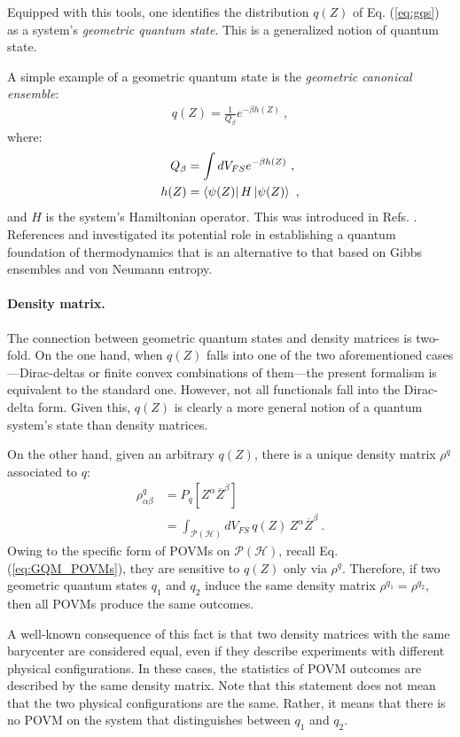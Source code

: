 \documentclass[draft,nofootinbib,pre,twocolumn,showpacs,showkeys,preprintnumbers,floatfix]{revtex4-1}
\newcommand{\1}{\mathbbm{1}}
\newcommand{\intP}{\int_{\mathcal{P}(\mathcal{H})} \!\!\!\!\!\!\!\!\!}
\begin{document}
Equipped with this tools, one identifies the distribution $q(Z)$ of Eq.
(\ref{eq:gqs}) as a system's \emph{geometric quantum state}. This is a
generalized notion of quantum state.

A simple example of a geometric quantum state is the 
\emph{geometric canonical ensemble}:
\begin{align*}
q(Z) = \frac{1}{Q_\beta} e^{-\beta h(Z)}
  ~,
\end{align*}
where:
\begin{align*}
  Q_\beta & = \int dV_{FS} e^{-\beta h(Z)} ~, \\
  h(Z) & = \bra{\psi(Z)}H\ket{\psi(Z)} ~,
\end{align*}
and $H$ is the system's Hamiltonian operator. This was introduced in 
Refs. \cite{Brody1998}. References \cite{Brody2016} and \cite{Anza20b} 
investigated its potential role in establishing a quantum foundation of
thermodynamics that is an alternative to that based on Gibbs ensembles and von
Neumann entropy. 

\paragraph*{Density matrix.}
The connection between geometric quantum states and density matrices is
two-fold. On the one hand, when $q(Z)$ falls into one of the
two aforementioned cases---Dirac-deltas or finite convex combinations of
them---the present formalism is equivalent to the standard one. However, not
all functionals fall into the Dirac-delta form. Given this, $q(Z)$ is clearly a
more general notion of a quantum system's state than density matrices.

On the other hand, given an arbitrary $q(Z)$, there is a unique
density matrix $\rho^{q}$ associated to $q$:
\begin{align}
\rho^q_{\alpha \beta} & = P_q[Z^\alpha \overline{Z}^\beta] \nonumber \\
  & = \intP dV_{FS} \, q(Z)  \, Z^\alpha \overline{Z}^\beta
  ~.
\label{eq:densitymatrix}
\end{align}
Owing to the specific form of POVMs on $\mathcal{P}(\mathcal{H})$, recall Eq. (\ref{eq:GQM_POVMs}), they
are sensitive to $q(Z)$ only via $\rho^q$. Therefore, if two geometric quantum states 
$q_1$ and $q_2$ induce the same density matrix $\rho^{q_1} = \rho^{q_2}$, then all POVMs
produce the same outcomes.

A well-known consequence of this fact is that two density matrices with the
same barycenter are considered equal, even if they describe experiments with
different physical configurations. In these cases, the statistics of POVM
outcomes are described by the same density matrix. Note that this statement
does not mean that the two physical configurations are the same. Rather, it
means that there is no POVM on the system that distinguishes between $q_1$ and
$q_2$.
\end{document}
